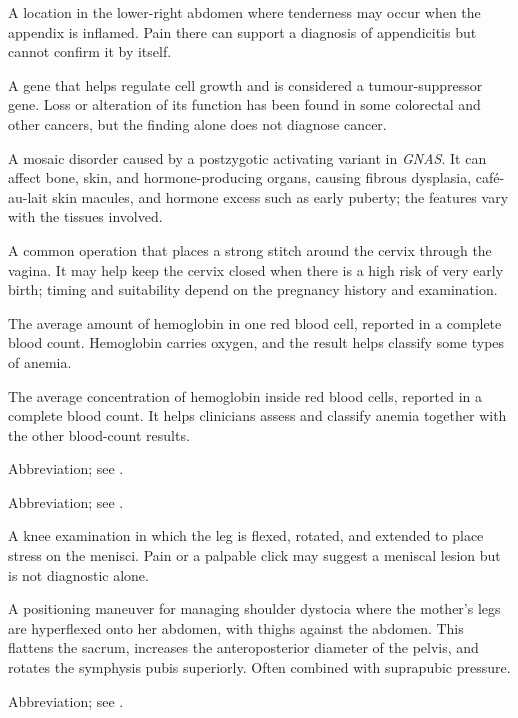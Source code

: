  A location in the lower-right abdomen where tenderness may occur when the appendix is inflamed. Pain there can support a diagnosis of appendicitis but cannot confirm it by itself.

 A gene that helps regulate cell growth and is considered a tumour-suppressor gene. Loss or alteration of its function has been found in some colorectal and other cancers, but the finding alone does not diagnose cancer.

 A mosaic disorder caused by a postzygotic activating variant in \textit{GNAS}. It can affect bone, skin, and hormone-producing organs, causing fibrous dysplasia, café-au-lait skin macules, and hormone excess such as early puberty; the features vary with the tissues involved.

 A common operation that places a strong stitch around the cervix through the vagina. It may help keep the cervix closed when there is a high risk of very early birth; timing and suitability depend on the pregnancy history and examination.

 The average amount of hemoglobin in one red blood cell, reported in a complete blood count. Hemoglobin carries oxygen, and the result helps classify some types of anemia.

 The average concentration of hemoglobin inside red blood cells, reported in a complete blood count. It helps clinicians assess and classify anemia together with the other blood-count results.

 Abbreviation; see .

 Abbreviation; see .

 A knee examination in which the leg is flexed, rotated, and extended to place stress on the menisci. Pain or a palpable click may suggest a meniscal lesion but is not diagnostic alone.

 A positioning maneuver for managing shoulder dystocia where the mother’s legs are
hyperflexed onto her abdomen, with thighs against the abdomen. This flattens the sacrum,
increases the anteroposterior diameter of the pelvis, and rotates the symphysis pubis
superiorly. Often combined with suprapubic pressure.

 Abbreviation; see .

